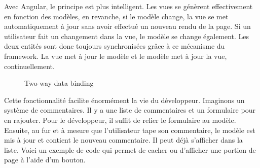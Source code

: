 \documentclass[a4paper,10pt,twoside]{sphinxmanual}
\begin{document}
Avec Angular, le principe est plus intelligent. Les vues se génèrent effectivement en fonction des modèles, en revanche, si le modèle change, la vue se met automatiquement à jour sans avoir effectué un nouveau rendu de la page. Si un utilisateur fait un changement dans la vue, le modèle se change également. Les deux entités sont donc toujours synchronisées grâce à ce mécanisme du framework. La vue met à jour le modèle et le modèle met à jour la vue, continuellement.
\begin{figure}[htbp]
\centering
\capstart

\caption{Two-way data binding}\end{figure}

Cette fonctionnalité facilite énormément la vie du développeur. Imaginons un système de commentaires. Il y a une liste de commentaires et un formulaire pour en rajouter. Pour le développeur, il suffit de relier le formulaire au modèle. Ensuite, au fur et à mesure que l'utilisateur tape son commentaire, le modèle est mis à jour et contient le nouveau commentaire. Il peut déjà s'afficher dans la liste. Voici un exemple de code qui permet de cacher ou d'afficher une portion de page à l'aide d'un bouton.
\end{document}
